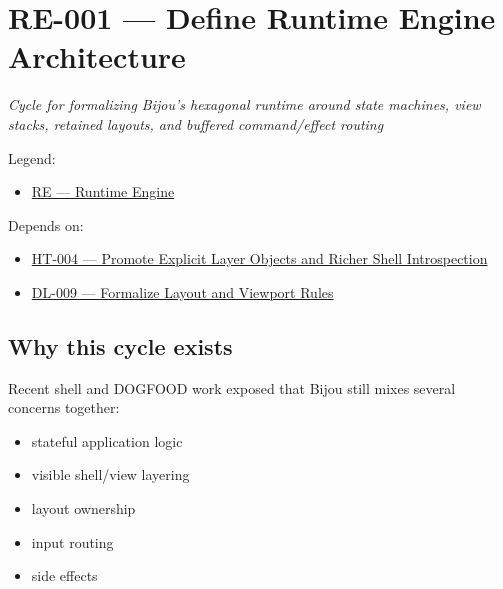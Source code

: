 \chapter{RE-001 --- Define Runtime Engine Architecture}\label{record-149}

\smallskip

\emph{Cycle for formalizing Bijou's hexagonal runtime around state machines, view stacks, retained layouts, and buffered command/effect routing}

Legend:

\begin{itemize}
\tightlist
\item
  \href{https://github.com/flyingrobots/bijou/blob/1853ad902f6bf219326409e7f743a5a1d6517dbc/docs/legends/RE-runtime-engine.md}{RE --- Runtime Engine}
\end{itemize}

Depends on:

\begin{itemize}
\tightlist
\item
  \href{https://github.com/flyingrobots/bijou/blob/cbd70612140e7a450d764b3c7be1c6af878b99bc/docs/design/HT-004-promote-explicit-layer-objects-and-richer-shell-introspection.md}{HT-004 --- Promote Explicit Layer Objects and Richer Shell Introspection}
\item
  \href{https://github.com/flyingrobots/bijou/blob/cbd70612140e7a450d764b3c7be1c6af878b99bc/docs/method/graveyard/legacy-backlog/up-next/DL-009-formalize-layout-and-viewport-rules.md}{DL-009 --- Formalize Layout and Viewport Rules}
\end{itemize}

\section{Why this cycle exists}\label{record-149-why-this-cycle-exists}

Recent shell and DOGFOOD work exposed that Bijou still mixes several concerns together:

\begin{itemize}
\tightlist
\item
  stateful application logic
\item
  visible shell/view layering
\item
  layout ownership
\item
  input routing
\item
  side effects
\end{itemize}

